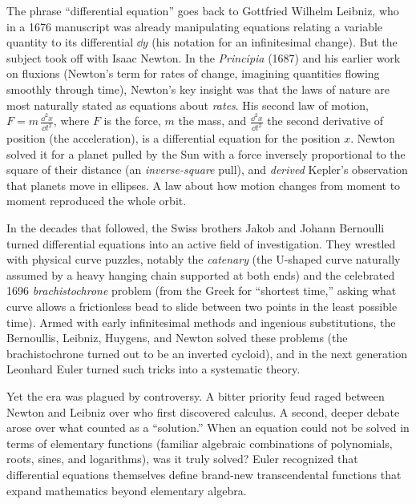 \begin{historybox}
The phrase ``differential equation'' goes back to Gottfried Wilhelm Leibniz, who in a 1676 manuscript was already manipulating equations relating a variable quantity to its differential $\dd y$ (his notation for an infinitesimal change). But the subject took off with Isaac Newton. In the \emph{Principia} (1687) and his earlier work on fluxions (Newton's term for rates of change, imagining quantities flowing smoothly through time), Newton's key insight was that the laws of nature are most naturally stated as equations about \emph{rates}. His second law of motion, $F = m\,\frac{\dd^2 x}{\dd t^2}$, where $F$ is the force, $m$ the mass, and $\frac{\dd^2 x}{\dd t^2}$ the second derivative of position (the acceleration), is a differential equation for the position $x$. Newton solved it for a planet pulled by the Sun with a force inversely proportional to the square of their distance (an \emph{inverse-square} pull), and \emph{derived} Kepler's observation that planets move in ellipses. A law about how motion changes from moment to moment reproduced the whole orbit.

In the decades that followed, the Swiss brothers Jakob and Johann Bernoulli turned differential equations into an active field of investigation. They wrestled with physical curve puzzles, notably the \emph{catenary} (the U-shaped curve naturally assumed by a heavy hanging chain supported at both ends) and the celebrated 1696 \emph{brachistochrone} problem (from the Greek for ``shortest time,'' asking what curve allows a frictionless bead to slide between two points in the least possible time). Armed with early infinitesimal methods and ingenious substitutions, the Bernoullis, Leibniz, Huygens, and Newton solved these problems (the brachistochrone turned out to be an inverted cycloid), and in the next generation Leonhard Euler turned such tricks into a systematic theory.

Yet the era was plagued by controversy. A bitter priority feud raged between Newton and Leibniz over who first discovered calculus. A second, deeper debate arose over what counted as a ``solution.'' When an equation could not be solved in terms of elementary functions (familiar algebraic combinations of polynomials, roots, sines, and logarithms), was it truly solved? Euler recognized that differential equations themselves define brand-new transcendental functions that expand mathematics beyond elementary algebra.


\end{historybox}

